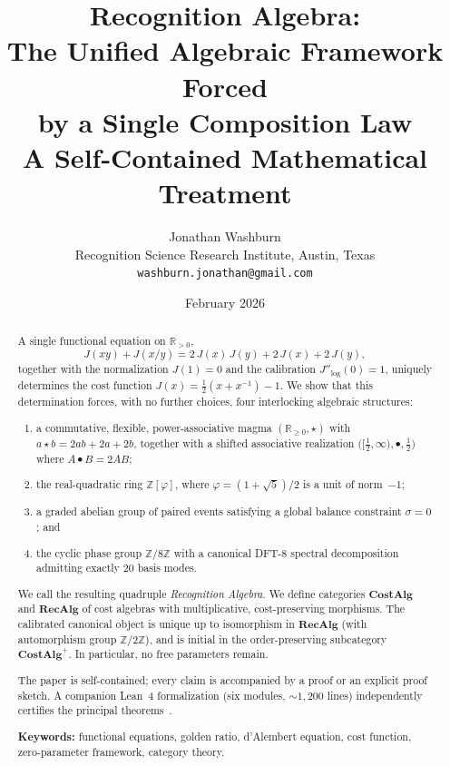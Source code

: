 \documentclass[11pt,a4paper]{article}
\title{\textbf{Recognition Algebra:\\
The Unified Algebraic Framework Forced\\by a Single Composition Law}\\[0.5em]
\large A Self-Contained Mathematical Treatment}
\author{Jonathan Washburn\\
\small Recognition Science Research Institute, Austin, Texas\\
\small \texttt{washburn.jonathan@gmail.com}}
\date{February 2026}
\theoremstyle{plain}
\theoremstyle{definition}
\theoremstyle{remark}
\newcommand{\phig}{\varphi}
\newcommand{\Jcost}{J}
\newcommand{\RR}{\mathbb{R}}
\newcommand{\ZZ}{\mathbb{Z}}
\begin{document}
\maketitle

\begin{abstract}
A single functional equation on $\RR_{>0}$,
\[
  \Jcost(xy)+\Jcost(x/y)
  = 2\,\Jcost(x)\,\Jcost(y)+2\,\Jcost(x)+2\,\Jcost(y),
\]
together with the normalization $\Jcost(1)=0$ and the calibration
$\Jcost''_{\!\log}(0)=1$, uniquely determines the cost function
$\Jcost(x)=\tfrac12(x+x^{-1})-1$.  We show that this determination
forces, with no further choices, four interlocking algebraic structures:
\begin{enumerate}[nosep,label=(\roman*)]
\item a commutative, flexible, power-associative magma
  $(\RR_{\ge0},\star)$ with $a\star b=2ab+2a+2b$, together with a
  shifted associative realization
  $\bigl([\tfrac12,\infty),\bullet,\tfrac12\bigr)$ where
  $A\bullet B=2AB$;
\item the real-quadratic ring $\ZZ[\phig]$, where
  $\phig=(1{+}\sqrt5)/2$ is a unit of norm~$-1$;
\item a graded abelian group of paired events satisfying a global
  balance constraint $\sigma=0$; and
\item the cyclic phase group $\ZZ/8\ZZ$ with a canonical DFT-8
  spectral decomposition admitting exactly 20 basis modes.
\end{enumerate}
We call the resulting quadruple \emph{Recognition Algebra}.
We define categories $\mathbf{CostAlg}$ and $\mathbf{RecAlg}$ of
cost algebras with multiplicative, cost-preserving morphisms.
The calibrated canonical object is unique up to isomorphism in
$\mathbf{RecAlg}$ (with automorphism group $\ZZ/2\ZZ$), and is
initial in the order-preserving subcategory
$\mathbf{CostAlg}^{+}$.  In particular, no free parameters remain.

The paper is self-contained; every claim is accompanied by a proof
or an explicit proof sketch.  A companion Lean~4 formalization
(six modules, ${\sim}1{,}200$ lines) independently certifies the
principal theorems~\cite{lean2015}.

\medskip\noindent\textbf{Keywords:} functional equations, golden ratio,
d'Alembert equation, cost function, zero-parameter framework, category
theory.
\end{abstract}

\tableofcontents

\end{document}
